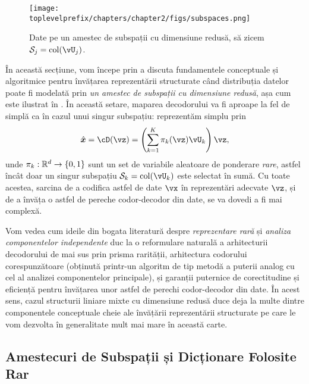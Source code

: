 \documentclass[../../book-main_ro.tex]{subfiles}
\begin{document}
\begin{figure}
    \centering
    \texttt{[image: \\toplevelprefix/chapters/chapter2/figs/subspaces.png]}
    \caption{Date pe un amestec de subspații cu dimensiune redusă, să zicem $\mathcal{S}_j
    = \mathop{\mathrm{col}}(\vU_j)$.}
    \label{fig:subspaces}
\end{figure}

În această secțiune, vom începe prin a discuta fundamentele conceptuale și algoritmice
pentru învățarea reprezentării structurate când distribuția datelor
poate fi modelată prin {\em un amestec de subspații cu dimensiune redusă}, așa cum este ilustrat în . În această setare, maparea decodorului va fi aproape la fel de simplă ca în cazul unui singur subspațiu: reprezentăm simplu prin
\begin{equation}\label{eq:mixture-subspaces-decoder-first-cut}
    \hat{\x} = \cD(\vz) = \left( \sum_{k=1}^K \pi_k(\vz)\vU_k \right) \vz,
\end{equation}
unde $\pi_k : \R^d \to \set{0,1}$ sunt un set de variabile aleatoare de ponderare \textit{rare},
astfel încât doar un singur subspațiu $\mathcal{S}_k
= \mathop{\mathrm{col}}(\vU_k) $ este selectat în sumă.
Cu toate acestea, sarcina de a codifica astfel de date $\vx$ în reprezentări adecvate $\vz$, și de a învăța o astfel de pereche codor-decodor din date, se va dovedi a fi mai complexă.

Vom vedea cum ideile din bogata literatură despre \textit{reprezentare rară}
și \textit{analiza componentelor independente} duc la o reformulare naturală a
arhitecturii decodorului de mai sus prin prisma rarității, arhitectura codorului corespunzătoare
(obținută printr-un algoritm de tip metodă a puterii analog
cu cel al analizei componentelor principale), și garanții puternice de corectitudine
și eficiență pentru învățarea unor astfel de perechi codor-decodor din date. În acest sens,
cazul structurii liniare mixte cu dimensiune redusă duce deja la multe dintre
componentele conceptuale cheie ale învățării reprezentării structurate pe care le vom dezvolta în
generalitate mult mai mare în această carte.


\subsection{Amestecuri de Subspații și Dicționare Folosite Rar}\label{sec:mixture-and-dict}
\end{document}
